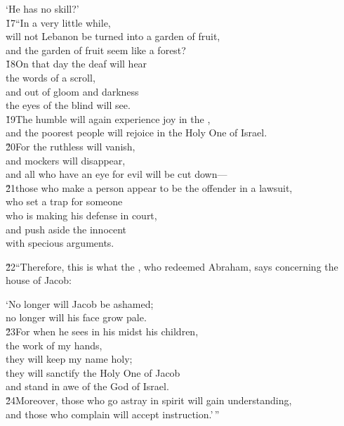 \begin{poetry}
\poemll    `He has no skill?' \\
\poeml \v{17}``In a very little while, \\
\poemll    will not Lebanon be turned into a garden of fruit, \\
\poemlll       and the garden of fruit seem like a forest? \\
\poeml \v{18}On that day the deaf will hear \\
\poemll    the words of a scroll, \\
\poeml and out of gloom and darkness \\
\poemll    the eyes of the blind will see. \\
\poeml \v{19}The humble will again experience joy in the , \\
\poemll    and the poorest people will rejoice in the Holy One of Israel. \\
\poeml \v{20}For the ruthless will vanish, \\
\poemll    and mockers will disappear, \\
\poemlll       and all who have an eye for evil will be cut down--- \\
\poeml \v{21}those who make a person appear to be the offender in a lawsuit, \\
\poemll    who set a trap for someone \\
\poemlll       who is making his defense in court, \\
\poeml and push aside the innocent \\
\poemll    with specious arguments.
\end{poetry}

\v{22}``Therefore, this is what the , who redeemed Abraham, says concerning the house of Jacob:

\begin{poetry}
\poeml `No longer will Jacob be ashamed; \\
\poemll    no longer will his face grow pale. \\
\poeml \v{23}For when he sees in his midst his children, \\
\poemll    the work of my hands, \\
\poeml they will keep my name holy; \\
\poemll    they will sanctify the Holy One of Jacob \\
\poemlll       and stand in awe of the God of Israel. \\
\poeml \v{24}Moreover, those who go astray in spirit will gain understanding, \\
\poemll    and those who complain will accept instruction.'\,''
\end{poetry}

